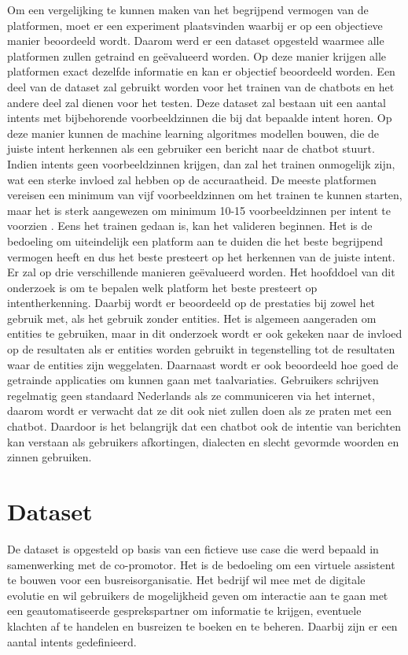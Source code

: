 Om een vergelijking te kunnen maken van het begrijpend vermogen van de platformen, moet er een experiment plaatsvinden waarbij er op een objectieve manier beoordeeld wordt. Daarom werd er een dataset opgesteld waarmee alle platformen zullen getraind en geëvalueerd worden. Op deze manier krijgen alle platformen exact dezelfde informatie en kan er objectief beoordeeld worden. Een deel van de dataset zal gebruikt worden voor het trainen van de chatbots en het andere deel zal dienen voor het testen. Deze dataset zal bestaan uit een aantal intents met bijbehorende voorbeeldzinnen die bij dat bepaalde intent horen. Op deze manier kunnen de machine learning algoritmes modellen bouwen, die de juiste intent herkennen als een gebruiker een bericht naar de chatbot stuurt. Indien intents geen voorbeeldzinnen krijgen, dan zal het trainen onmogelijk zijn, wat een sterke invloed zal hebben op de accuraatheid. De meeste platformen vereisen een minimum van vijf voorbeeldzinnen om het trainen te kunnen starten, maar het is sterk aangewezen om minimum 10-15 voorbeeldzinnen per intent te voorzien \autocite{Greyling2019}. Eens het trainen gedaan is, kan het valideren beginnen. Het is de bedoeling om uiteindelijk een platform aan te duiden die het beste begrijpend vermogen heeft en dus het beste presteert op het herkennen van de juiste intent. Er zal op drie verschillende manieren geëvalueerd worden. Het hoofddoel van dit onderzoek is om te bepalen welk platform het beste presteert op intentherkenning. Daarbij wordt er beoordeeld op de prestaties bij zowel het gebruik met, als het gebruik zonder entities. Het is algemeen aangeraden om entities te gebruiken, maar in dit onderzoek wordt er ook gekeken naar de invloed op de resultaten als er entities worden gebruikt in tegenstelling tot de resultaten waar de entities zijn weggelaten. Daarnaast wordt er ook beoordeeld hoe goed de getrainde applicaties om kunnen gaan met taalvariaties. Gebruikers schrijven regelmatig geen standaard Nederlands als ze communiceren via het internet, daarom wordt er verwacht dat ze dit ook niet zullen doen als ze praten met een chatbot. Daardoor is het belangrijk dat een chatbot ook de intentie van berichten kan verstaan als gebruikers afkortingen, dialecten en slecht gevormde woorden en zinnen gebruiken.

\section{Dataset}
\label{sec:dataset}

De dataset is opgesteld op basis van een fictieve use case die werd bepaald in samenwerking met de co-promotor. Het is de bedoeling om een virtuele assistent te bouwen voor een busreisorganisatie. Het bedrijf wil mee met de digitale evolutie en wil gebruikers de mogelijkheid geven om interactie aan te gaan met een geautomatiseerde gesprekspartner om informatie te krijgen, eventuele klachten af te handelen en busreizen te boeken en te beheren. Daarbij zijn er een aantal intents gedefinieerd.


